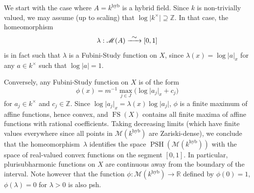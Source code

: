 \documentclass[JEP,XML,SOM,Unicode,published]{cedram}
\newcommand{\To}[1]{\mathchoice{\xrightarrow{\textstyle\kern4pt#1\kern3pt}}{\stackrel{#1}{\longrightarrow}}{}{}}
\theoremstyle{definition}
\newcommand \R{\mathbb R}
\newcommand \Z{\mathbb Z}
\newcommand \M {\mathscr {M}}
\DeclareMathOperator{\FS}{FS}
\newcommand{\hyb}{\mathrm{hyb}}
\DeclareMathOperator{\PSH}{PSH}
\begin{document}
We start with the case where $A = k^{\hyb}$ is a hybrid field. Since $k$ is non-trivially valued, we may assume (up to scaling) that $\log \lvert k^{\times} \rvert \supseteq \Z$. In that case, the homeomorphism
\[
\lambda: \mathscr{M}(A) \To{\sim} [0,1]
\]
is in fact such that $\lambda$ is a Fubini-Study function on $X$, since $\lambda(x) = \log \lvert a \rvert_x$ for any $a \in k^{\times}$ such that $\log \lvert a \rvert =1$.

Conversely, any Fubini-Study function on $X$ is of the form
\[
\phi(x) = m^{-1} \max_{j \in J} \bigl(\log \lvert a_j \rvert_x + c_j\bigr)
\]
for $a_j \in k^{\times}$ and $c_j \in \Z$. Since $\log \lvert a_j \rvert_x = \lambda(x) \log \lvert a_j \rvert$, $\phi$ is a finite maximum of affine functions, hence convex, and $\FS(X)$ contains all finite maxima of affine functions with rational coefficients. Taking decreasing limits (which have finite values everywhere since all points in $\M(k^{\hyb})$ are Zariski-dense), we conclude that the homeomorphism~$\lambda$ identifies the space $\PSH(\mathscr{M}(k^{\hyb}))$ with the space of real-valued convex functions on the segment $[0,1]$. In particular, plurisubharmonic functions on $X$ are continuous away from the boundary of the interval. Note however that the function $\phi: \M(k^{\hyb}) \to \R$ defined by $\phi(0)=1$, $\phi(\lambda) =0$ for $\lambda >0$ is also psh.
\end{document}
